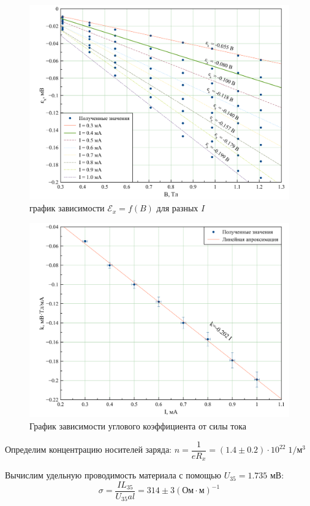 \documentclass[a4paper, 12pt]{article}
\begin{document}
	\begin {figure}[H]
		\begin{center}
			\includegraphics[width = 0.9 \textwidth]{graph2.png}
			\caption{график зависимости $\mathscr{E}_x = f(B)$ для разных $I$}
		\end{center}
	\end {figure}
	
		\begin {figure}[H]
	\begin{center}
		\includegraphics[width = 0.85 \textwidth]{graph3.png}
		\caption{График зависимости углового коэффициента от силы тока}
	\end{center}
	\end {figure}

Определим концентрацию носителей заряда: $n = \dfrac{1}{eR_x} = (1.4 \pm 0.2) \cdot 10^{22} \; 1/\text{м}^3$
	
Вычислим удельную проводимость материала с помощью $U_{35}=1.735$ мВ: $$\sigma=\dfrac{I L_{35}}{U_{35} al} =314\pm3(\text{Ом}\cdot\text{м})^{-1}$$
\end{document}
